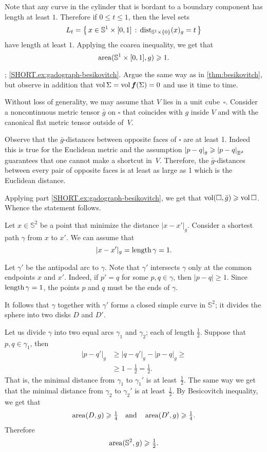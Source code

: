Note that any curve in the cylinder that is bordant to a boundary component has length at least $1$.
Therefore if $0\le t\le  1$, then the level sets 
\[L_t=\left\{\,{x\in \mathbb{S}^1\times[0,1]}\,:\,{\mathrm{dist}_{\mathbb{S}^1\times\{0\}}(x)_{g}=t}\,\right\}\] have length at least $1$.
Applying the coarea inequality, we get that
\[\operatorname{\rm area}\nolimits(\mathbb{S}^1\times[0,1],g)\geqslant 1.\]

\parbf{\ref{ex:gadograph}}; \ref{SHORT.ex:gadograph-besikovitch}.
Argue the same way as in \ref{thm:besikovitch}, but observe in addition that $\operatorname{\rm vol}\nolimits \Sigma=\operatorname{\rm vol}\nolimits \bm{f}(\Sigma)=0$ and use it time to time.

Without loss of generality, we may assume that $V$ lies in a unit cube~$\square$.
Consider a noncontinuous metric tensor $\bar g$ on $\square$ that coincides with $g$ inside $V$ and with the canonical flat metric tensor outside of~$V$.

Observe that the $\bar g$-distances between opposite faces of $\square$ are at least 1.
Indeed this is true for the Euclidean metric and the assumption $\dist{p}{q}{g}\ge\dist{p}{q}{\EE^d}$  guarantees that one cannot make a shortcut in~$V$.
Therefore, the $\bar g$-distances between every pair of opposite faces is at least as large as 1 which is the Euclidean distance.

Applying part \ref{SHORT.ex:gadograph-besikovitch}, we get that $\operatorname{\rm vol}\nolimits(\square,\bar g)\geqslant \operatorname{\rm vol}\nolimits\square$.
Whence the statement follows.


Let $x\in \mathbb{S}^2$ be a point that minimize the distance $|x-x'|_g$.
Consider a shortest path $\gamma$ from $x$ to $x'$.
We can assume that 
\[|x-x'|_g=\mathop{\rm length}\nolimits \gamma=1.\]

Let $\gamma'$ be the antipodal arc to $\gamma$.
Note that $\gamma'$ intersects $\gamma$ only at the common endpoints $x$ and $x'$.
Indeed, if $p'=q$ for some $p,q\in\gamma$, then $|p-q|\ge 1$.
Since $\mathop{\rm length}\nolimits \gamma=1$, the points $p$ and $q$ must be the ends of $\gamma$.

It follows that $\gamma$ together with $\gamma'$ forms a closed simple curve in $\mathbb{S}^2$;
it divides the sphere into two disks $D$ and $D'$.

Let us divide $\gamma$ into two equal arcs $\gamma_1$ and $\gamma_2$; each of length $\tfrac12$.
Suppose that $p,q\in\gamma_1$, then 
\begin{align*}
|p-q'|_g&\ge |q-q'|_g-|p-q|_g\ge
\\
&\ge 1-\tfrac12=\tfrac12.
\end{align*}
That is, the minimal distance from $\gamma_1$ to $\gamma_1'$ is at least~$\tfrac12$.
The same way we get that the minimal distance from $\gamma_2$ to $\gamma_2'$ is at least~$\tfrac12$.
By Besicovitch inequality, we get that 
\[\operatorname{\rm area}\nolimits(D,g)\geqslant \tfrac14\quad\text{and}\quad \operatorname{\rm area}\nolimits(D',g)\geqslant \tfrac14.\]
Therefore 
\[\operatorname{\rm area}\nolimits(\mathbb{S}^2,g)\geqslant\tfrac12.\]

